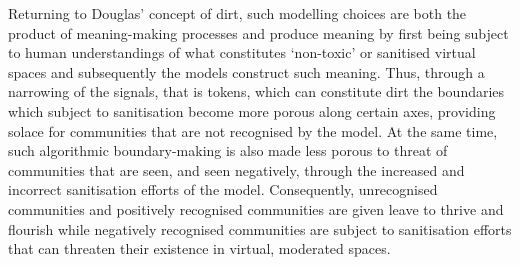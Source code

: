 Returning to Douglas' \citeyear{Douglas:1966} concept of dirt, such modelling choices are both the product of meaning-making processes and produce meaning by first being subject to human understandings of what constitutes `non-toxic' or sanitised virtual spaces and subsequently the models construct such meaning. Thus, through a narrowing of the signals, that is tokens, which can constitute dirt the boundaries which subject to sanitisation become more porous along certain axes, providing solace for communities that are not recognised by the model. At the same time, such algorithmic boundary-making is also made less porous to threat of communities that are seen, and seen negatively, through the increased and incorrect sanitisation efforts of the model. Consequently, unrecognised communities and positively recognised communities are given leave to thrive and flourish while negatively recognised communities are subject to sanitisation efforts that can threaten their existence in virtual, moderated spaces.

